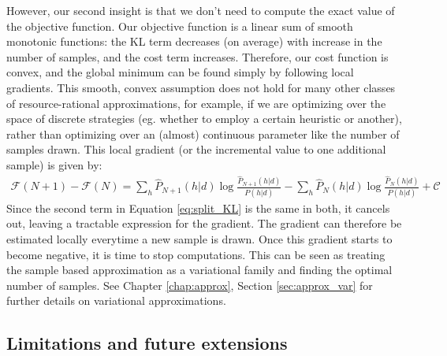 However, our second insight is that we don't need to compute the exact value of the objective function. Our objective function is a linear sum of smooth monotonic functions: the KL term decreases (on average) with increase in the number of samples, and the cost term increases. Therefore, our cost function is convex, and the global minimum can be found simply by following local gradients. This smooth, convex assumption does not hold for many other classes of resource-rational approximations, for example, if we are optimizing over the space of discrete strategies (eg. whether to employ a certain heuristic or another), rather than optimizing over an (almost) continuous parameter like the number of samples drawn. This local gradient (or the incremental value to one additional sample) is given by:
\begin{align}
\mathcal{F}(N + 1) - \mathcal{F}(N) =  \sum_h \hat{P}_{N+1}(h|d) \log \frac{\hat{P}_{N+1}(h|d)}{P(h|d)} -  \sum_h \hat{P}_N(h|d) \log \frac{\hat{P}_N(h|d)}{P(h|d)} + \mathcal{C}
\end{align}
Since the second term in Equation \ref{eq:split_KL} is the same in both, it cancels out, leaving a tractable expression for the gradient. The gradient can therefore be estimated locally everytime a new sample is drawn. Once this gradient starts to become negative, it is time to stop computations. This can be seen as treating the sample based approximation as a variational family and finding the optimal number of samples\cite{saeedi17}. See Chapter \ref{chap:approx}, Section \ref{sec:approx_var} for further details on variational approximations.

\subsection{Limitations and future extensions}

